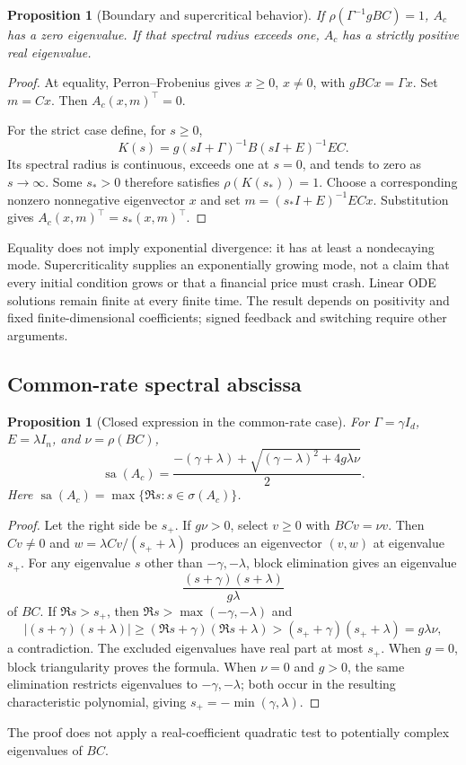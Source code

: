 \documentclass[11pt,a4paper]{article}
\newtheorem{proposition}[theorem]{Proposition}
\theoremstyle{definition}\newtheorem{definition}[theorem]{Definition}
\theoremstyle{remark}\newtheorem{remark}[theorem]{Remark}
\newcommand{\smax}{\operatorname{sa}}\newcommand{\argmin}{\operatorname*{arg\,min}}
\begin{document}
\begin{proposition}[Boundary and supercritical behavior]\label{prop:ctboundary}
If $\rho(\Gamma^{-1}gBC)=1$, $A_c$ has a zero eigenvalue. If that spectral radius exceeds one, $A_c$ has a strictly positive real eigenvalue.
\end{proposition}
\begin{proof}
At equality, Perron--Frobenius gives $x\ge0$, $x\ne0$, with $gBCx=\Gamma x$. Set $m=Cx$. Then $A_c(x,m)^\top=0$.

For the strict case define, for $s\ge0$,
\[
 K(s)=g(sI+\Gamma)^{-1}B(sI+E)^{-1}EC.
\]
Its spectral radius is continuous, exceeds one at $s=0$, and tends to zero as $s\to\infty$. Some $s_*>0$ therefore satisfies $\rho(K(s_*))=1$. Choose a corresponding nonzero nonnegative eigenvector $x$ and set $m=(s_*I+E)^{-1}ECx$. Substitution gives $A_c(x,m)^\top=s_*(x,m)^\top$.
\end{proof}

Equality does not imply exponential divergence: it has at least a nondecaying mode. Supercriticality supplies an exponentially growing mode, not a claim that every initial condition grows or that a financial price must crash. Linear ODE solutions remain finite at every finite time. The result depends on positivity and fixed finite-dimensional coefficients; signed feedback and switching require other arguments.

\subsection{Common-rate spectral abscissa}
\begin{proposition}[Closed expression in the common-rate case]\label{prop:sa}
For $\Gamma=\gamma I_d$, $E=\lambda I_n$, and $\nu=\rho(BC)$,
\begin{equation}
 \smax(A_c)=
 \frac{-(\gamma+\lambda)+\sqrt{(\gamma-\lambda)^2+4g\lambda\nu}}{2}.
 \label{eq:sa}
\end{equation}
Here $\smax(A_c)=\max\{\Re s:s\in\sigma(A_c)\}$.
\end{proposition}
\begin{proof}
Let the right side be $s_+$. If $g\nu>0$, select $v\ge0$ with $BCv=\nu v$. Then $Cv\ne0$ and
$w=\lambda Cv/(s_++\lambda)$ produces an eigenvector $(v,w)$ at eigenvalue $s_+$. For any eigenvalue $s$ other than $-\gamma,-\lambda$, block elimination gives an eigenvalue
\[
 \frac{(s+\gamma)(s+\lambda)}{g\lambda}
\]
of $BC$. If $\Re s>s_+$, then $\Re s>\max(-\gamma,-\lambda)$ and
\[
 |(s+\gamma)(s+\lambda)|\ge(\Re s+\gamma)(\Re s+\lambda)
 >(s_++\gamma)(s_++\lambda)=g\lambda\nu,
\]
a contradiction. The excluded eigenvalues have real part at most $s_+$. When $g=0$, block triangularity proves the formula. When $\nu=0$ and $g>0$, the same elimination restricts eigenvalues to $-\gamma,-\lambda$; both occur in the resulting characteristic polynomial, giving $s_+=-\min(\gamma,\lambda)$.
\end{proof}
The proof does not apply a real-coefficient quadratic test to potentially complex eigenvalues of $BC$.
\end{document}
